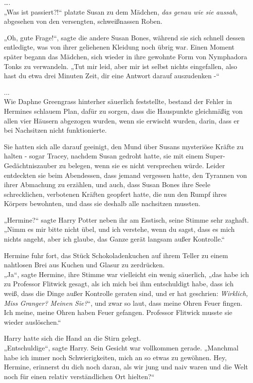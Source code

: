 {….\\ „Was ist passiert?!“ platzte Susan zu dem Mädchen, \emph{das genau wie sie aussah}, abgesehen von den versengten, schweißnassen Roben.

„Oh, gute Frage!“, sagte die andere Susan Bones, während sie sich schnell dessen entledigte, was von ihrer geliehenen Kleidung noch übrig war. Einen Moment später begann das Mädchen, sich wieder in ihre gewohnte Form von Nymphadora Tonks zu verwandeln. „Tut mir leid, aber mir ist selbst nichts eingefallen, also hast du etwa drei Minuten Zeit, dir eine Antwort darauf auszudenken -“

...\\ Wie Daphne Greengrass hinterher säuerlich feststellte, bestand der Fehler in Hermines schlauem Plan, dafür zu sorgen, dass die Hauspunkte gleichmäßig von allen vier Häusern abgezogen wurden, wenn sie erwischt wurden, darin, dass er bei Nachsitzen nicht funktionierte.

Sie hatten sich alle darauf geeinigt, den Mund über Susans mysteriöse Kräfte zu halten - sogar Tracey, nachdem Susan gedroht hatte, sie mit einem Super-Gedächtniszauber zu belegen, wenn sie es nicht versprechen würde. Leider entdeckten sie beim Abendessen, dass jemand vergessen hatte, den Tyrannen von ihrer Abmachung zu erzählen, und auch, dass Susan Bones ihre Seele schrecklichen, verbotenen Kräften geopfert hatte, die nun den Rumpf ihres Körpers bewohnten, und dass sie deshalb alle nachsitzen mussten.

„Hermine?“ sagte Harry Potter neben ihr am Esstisch, seine Stimme sehr zaghaft. „Nimm es mir bitte nicht übel, und ich verstehe, wenn du sagst, dass es mich nichts angeht, aber ich glaube, das Ganze gerät langsam außer Kontrolle.“

Hermine fuhr fort, das Stück Schokoladenkuchen auf ihrem Teller zu einem nahtlosen Brei aus Kuchen und Glasur zu zerdrücken.\\ „Ja“, sagte Hermine, ihre Stimme war vielleicht ein wenig säuerlich, „das habe ich zu Professor Flitwick gesagt, als ich mich bei ihm entschuldigt habe, dass ich weiß, dass die Dinge außer Kontrolle geraten sind, und er hat geschrien: \emph{Wirklich, Miss Granger? Meinen Sie?}“, und zwar so laut, dass meine Ohren Feuer fingen. Ich meine, meine Ohren haben Feuer gefangen. Professor Flitwick musste sie wieder auslöschen.“

Harry hatte sich die Hand an die Stirn gelegt.\\ „Entschuldige“, sagte Harry. Sein Gesicht war vollkommen gerade. „Manchmal habe ich immer noch Schwierigkeiten, mich an so etwas zu gewöhnen. Hey, Hermine, erinnerst du dich noch daran, als wir jung und naiv waren und die Welt noch für einen relativ verständlichen Ort hielten?“

}
